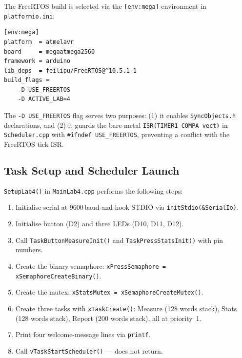 \documentclass[12pt]{article}
\begin{document}
The FreeRTOS build is selected via the \texttt{[env:mega]} environment in \texttt{platformio.ini}:

\begin{lstlisting}
[env:mega]
platform  = atmelavr
board     = megaatmega2560
framework = arduino
lib_deps  = feilipu/FreeRTOS@^10.5.1-1
build_flags =
    -D USE_FREERTOS
    -D ACTIVE_LAB=4
\end{lstlisting}

The \texttt{-D USE\_FREERTOS} flag serves two purposes: (1) it enables \texttt{SyncObjects.h} declarations, and (2) it guards the bare-metal \texttt{ISR(TIMER1\_COMPA\_vect)} in \texttt{Scheduler.cpp} with \texttt{\#ifndef USE\_FREERTOS}, preventing a conflict with the FreeRTOS tick ISR.

\subsection{Task Setup and Scheduler Launch}

\texttt{SetupLab4()} in \texttt{MainLab4.cpp} performs the following steps:
\begin{enumerate}
  \item Initialise serial at 9600\,baud and hook STDIO via \texttt{initStdio(\&SerialIo)}.
  \item Initialise button (D2) and three LEDs (D10, D11, D12).
  \item Call \texttt{TaskButtonMeasureInit()} and \texttt{TaskPressStatsInit()} with pin numbers.
  \item Create the binary semaphore: \texttt{xPressSemaphore = xSemaphoreCreateBinary()}.
  \item Create the mutex: \texttt{xStatsMutex = xSemaphoreCreateMutex()}.
  \item Create three tasks with \texttt{xTaskCreate()}: Measure (128 words stack), Stats (128 words stack), Report (200 words stack), all at priority~1.
  \item Print four welcome-message lines via \texttt{printf}.
  \item Call \texttt{vTaskStartScheduler()} — does not return.
\end{enumerate}
\end{document}
